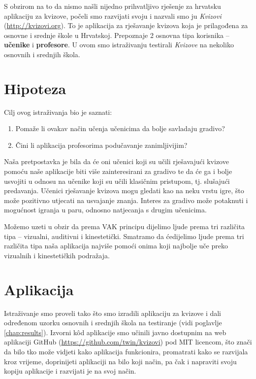 \documentclass[11pt]{scrreprt}
\begin{document}
S obzirom na to da nismo našli nijedno prihvatljivo rješenje za hrvatsku
aplikaciju za kvizove, počeli smo razvijati svoju i nazvali smo ju
\emph{Kvizovi} (\url{http://kvizovi.org}). To je aplikacija za rješavanje
kvizova koja je prilagođena za osnovne i srednje škole u Hrvatskoj. Prepoznaje
2 osnovna tipa korisnika -- \textbf{učenike} i \textbf{profesore}. U ovom smo
istraživanju testirali \emph{Kvizove} na nekoliko osnovnih i srednjih škola.

\chapter{Hipoteza}

Cilj ovog istraživanja bio je saznati:

\begin{enumerate}
  \item Pomaže li ovakav način učenja učenicima da bolje savladaju gradivo?
  \item Čini li aplikacija profesorima podučavanje zanimljivijim?
\end{enumerate}

Naša pretpostavka je bila da će oni učenici koji su učili rješavajući kvizove
pomoću naše aplikacije biti više zainteresirani za gradivo te da će ga i bolje
usvojiti u odnosu na učenike koji su učili klasičnim pristupom, tj. slušajući
predavanja. Učenici rješavanje kvizova mogu gledati kao na neku vrstu igre, što
može pozitivno utjecati na usvajanje znanja. Interes za gradivo može potaknuti
i mogućnost igranja u paru, odnosno natjecanja s drugim učenicima.

Možemo uzeti u obzir da prema VAK principu dijelimo ljude prema tri različita
tipa -- vizualni, auditivni i kinestetički.\cite{clark11} Smatramo da
ćedijelimo ljude prema tri različita tipa naša aplikacija najviše pomoći onima
koji najbolje uče preko vizualnih i kinestetičkih podražaja.

\chapter{Aplikacija}

Istraživanje smo proveli tako što smo izradili aplikaciju za kvizove i dali
određenom uzorku osnovnih i srednjih škola na testiranje (vidi poglavlje
\ref{chap:results}). Izvorni kôd aplikacije smo učinili javno dostupnim na web
aplikaciji GitHub (\url{https://github.com/twin/kvizovi}) pod MIT licencom, što
znači da bilo tko može vidjeti kako aplikacija funkcionira, promatrati kako se
razvijala kroz vrijeme, doprinijeti aplikaciji na bilo koji način, pa čak i
napraviti svoju kopiju aplikacije i razvijati je na svoj način.\cite{mit}
\end{document}
